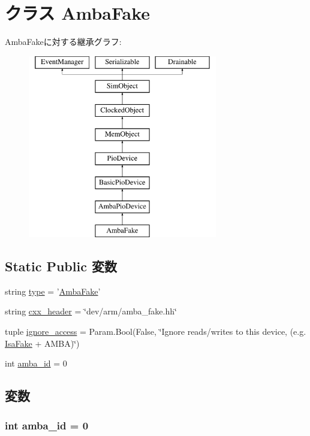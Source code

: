\hypertarget{classRealView_1_1AmbaFake}{
\section{クラス AmbaFake}
\label{classRealView_1_1AmbaFake}
}
AmbaFakeに対する継承グラフ:\begin{figure}[H]
\begin{center}
\leavevmode
\includegraphics[height=8cm]{classRealView_1_1AmbaFake}
\end{center}
\end{figure}
\subsection*{Static Public 変数}
\begin{DoxyCompactItemize}
\item 
string \hyperlink{classRealView_1_1AmbaFake_acce15679d830831b0bbe8ebc2a60b2ca}{type} = '\hyperlink{classRealView_1_1AmbaFake}{AmbaFake}'
\item 
string \hyperlink{classRealView_1_1AmbaFake_a17da7064bc5c518791f0c891eff05fda}{cxx\_\-header} = \char`\"{}dev/arm/amba\_\-fake.hh\char`\"{}
\item 
tuple \hyperlink{classRealView_1_1AmbaFake_ab89da802f45f5d38c00fb81d62e65abb}{ignore\_\-access} = Param.Bool(False, \char`\"{}Ignore reads/writes to this device, (e.g. \hyperlink{classIsaFake}{IsaFake} + AMBA)\char`\"{})
\item 
int \hyperlink{classRealView_1_1AmbaFake_a38d7b9edfe6f0eea7a54e7e4f6253f3a}{amba\_\-id} = 0
\end{DoxyCompactItemize}


\subsection{変数}
\hypertarget{classRealView_1_1AmbaFake_a38d7b9edfe6f0eea7a54e7e4f6253f3a}{
\subsubsection[{amba\_\-id}]{\setlength{\rightskip}{0pt plus 5cm}int {\bf amba\_\-id} = 0}}
\label{classRealView_1_1AmbaFake_a38d7b9edfe6f0eea7a54e7e4f6253f3a}


